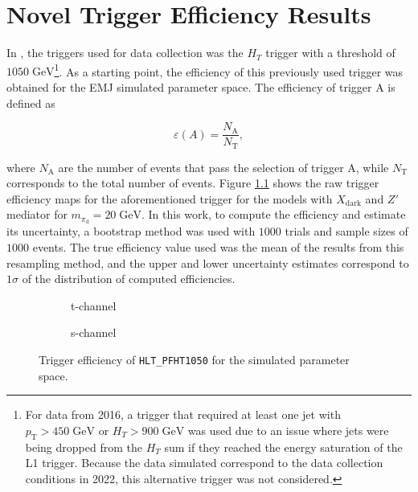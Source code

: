 \chapter{Novel Trigger Efficiency Results}

In \cite{cmscollaborationSearchNewPhysics2024}, the triggers used for data collection was the $H_T$ trigger with a threshold of $1050\;\text{GeV}$\footnote{For data from 2016, a trigger that required at least one jet with $p_\text{T} > 450\;\text{GeV}$ or $H_T > 900\;\text{GeV}$ was used due to an issue where jets were being dropped from the $H_T$ sum if they reached the energy saturation of the L1 trigger. Because the data simulated correspond to the data collection conditions in 2022, this alternative trigger was not considered.}. As a starting point, the efficiency of this previously used trigger was obtained for the EMJ simulated parameter space. The efficiency of trigger A is defined as

\begin{equation}
    \varepsilon(A) = \frac{N_{\text{A}}}{N_\text{T}},
\end{equation}

\noindent where $N_{\text{A}}$ are the number of events that pass the selection of trigger A, while $N_\text{T}$ corresponds to the total number of events. Figure \ref{fig:ht1050} shows the raw trigger efficiency maps for the aforementioned trigger for the models with $X_{\text{dark}}$ and $Z'$ mediator for $m_{\pi_{\text{d}}} = 20 \;\text{GeV}$. In this work, to compute the efficiency and estimate its uncertainty, a bootstrap method was used with $1000$ trials and sample sizes of $1000$ events. The true efficiency value used was the mean of the results from this resampling method, and the upper and lower uncertainty estimates correspond to $1\sigma$ of the distribution of computed efficiencies.

\begin{figure}[h]
    \centering
    \begin{subfigure}{0.45\textwidth}
        
        \caption{t-channel}
    \end{subfigure}
    \hfill
    \begin{subfigure}{0.45\textwidth}
        
        \caption{s-channel}
    \end{subfigure}
    \caption{Trigger efficiency of \texttt{HLT\_PFHT1050} for the simulated parameter space.}
    \label{fig:ht1050}
\end{figure}

